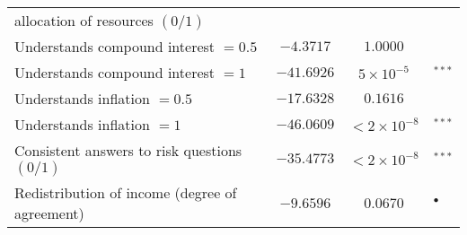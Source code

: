 \documentclass[a4paper,12pt]{article}
\begin{document}
{\begin{threeparttable}
\begin{small}
\begin{tabular}{lccl}
 \vspace{0.15cm}\hspace{0.6cm}allocation of resources $(0/1)$\tnote{c}&\\
 \vspace{0.15cm}Understands compound interest $=0.5$&\multirow{1}{*}{$-4.3717$}&\multirow{1}{*}{$1.0000$}&\multirow{1}{*}{ }\\
 \vspace{0.15cm}Understands compound interest $=1$&\multirow{1}{*}{$-41.6926$}&\multirow{1}{*}{$5\times10^{-5}$}&\multirow{1}{*}{$^{***}$}\\
  \vspace{0.15cm}Understands inflation $=0.5$&$-17.6328$&$0.1616$& \\
 \vspace{0.15cm}Understands inflation $=1$&$-46.0609$&$<2\times10^{-8}$&$^{***}$\\
 
 
\vspace{0.15cm}Consistent answers to risk questions $(0/1)$&\multirow{1}{*}{$-35.4773$}&\multirow{1}{*}{$<2\times10^{-8}$}&\multirow{1}{*}{$^{***}$}\\
\vspace{0.15cm}Redistribution of income (degree of agreement)\tnote{d, e}&\multirow{1}{*}{$-9.6596$}&\multirow{1}{*}{$0.0670$}&\multirow{1}{*}{$^{\bullet}$}\\


\end{tabular}
\end{small}
\end{threeparttable}}
\end{document}
